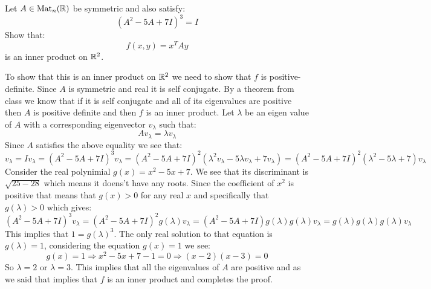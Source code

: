 \documentclass[11pt, a4paper]{article}
\begin{document}
\begin{exercise}
  Let $A\in \mathrm{Mat}_n(\mathbb{R})$ be symmetric and also satisfy:
  \[
    (A^2-5A+7I)^3 = I
  \]
  Show that:
  \[
    f(x,y) = x^{T} A y
  \]
  is an inner product on $\mathbb{R}^2$.
\end{exercise}
\begin{solution}
  To show that this is an inner product on $\mathbb{R}^2$ we need to show that $f$
  is positive-definite. Since $A$ is symmetric and real it is self conjugate.
  By a theorem from class we know that if it is self conjugate and all of 
  its eigenvalues are positive then $A$ is positive definite and then
  $f$ is an inner product. Let $\lambda$ be an eigen value of $A$ with
  a corresponding eigenvector $v_\lambda$ such that:
  \[
    Av_{\lambda} = \lambda v_{\lambda}
  \]
  Since $A$ satisfies the above equality we see that:
  \[
    v_{\lambda} = Iv_{\lambda} = (A^2-5A+7I)^3 v_{\lambda} = 
    (A^2-5A+7I)^2 
    (\lambda^2 v_{\lambda} - 5\lambda v_{\lambda} + 7 v_{\lambda}) = 
    (A^2-5A+7I)^2 (\lambda^2 - 5\lambda + 7)v_{\lambda}
  \]
  Consider the real polynimial $g(x) = x^2-5x+7$. We see that its discriminant
  is $\sqrt{25 - 28}$ which means it doens't have any roots. Since the
  coefficient of $x^2$ is positive that means that $g(x) > 0$ for any
  real $x$ and specifically that $g(\lambda) > 0$ which gives:
  \[
    (A^2-5A+7I)^3 v_{\lambda} = 
    (A^2-5A+7I)^2 g(\lambda) v_{\lambda} = 
    (A^2-5A+7I)   g(\lambda)g(\lambda) v_{\lambda} = 
            g(\lambda)g(\lambda)g(\lambda) v_{\lambda}
  \]
  This implies that $1 = g(\lambda)^3$. The only real solution to that
  equation is $g(\lambda) = 1$, considering the equation $g(x) = 1$
  we see:
  \[
    g(x) = 1 \Rightarrow x^2-5x+7 - 1 = 0 \Rightarrow (x-2)(x-3) = 0
  \]
  So $\lambda = 2$ or $\lambda = 3$. This implies that all the eigenvalues
  of $A$ are positive and as we said that implies that $f$ is an inner
  product and completes the proof.
\end{solution}
\end{document}

